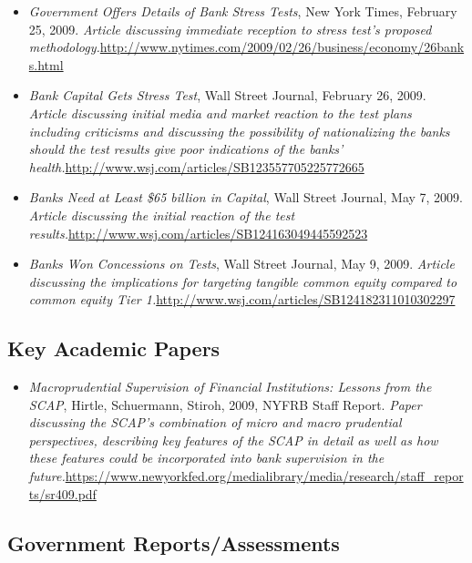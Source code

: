 \documentclass[12pt]{article}
\begin{document}
\begin{itemize}
\item
\emph{Government
  Offers Details of Bank Stress Tests}, New York Times, February 25,
  2009. \emph{Article discussing immediate reception to stress test's
  proposed methodology.}\url{http://www.nytimes.com/2009/02/26/business/economy/26banks.html}
\item
\emph{Bank
  Capital Gets Stress Test}, Wall Street Journal, February 26, 2009.
  \emph{Article discussing initial media and market reaction to the test
  plans including criticisms and discussing the possibility of
  nationalizing the banks should the test results give poor indications
  of the banks' health.}\url{http://www.wsj.com/articles/SB123557705225772665}
\item
\emph{Banks
  Need at Least \$65 billion in Capital}, Wall Street Journal, May 7,
  2009. \emph{Article discussing the initial reaction of the test
  results.}\url{http://www.wsj.com/articles/SB124163049445592523}
\item
\emph{Banks
  Won Concessions on Tests}, Wall Street Journal, May 9, 2009.
  \emph{Article discussing the implications for targeting tangible
  common equity compared to common equity Tier 1.}\url{http://www.wsj.com/articles/SB124182311010302297}
\end{itemize}

\subsection{Key Academic Papers}

\begin{itemize}
\item
\emph{Macroprudential
  Supervision of Financial Institutions: Lessons from the SCAP},
  Hirtle, Schuermann, Stiroh, 2009, NYFRB Staff Report. \emph{Paper
  discussing the SCAP's combination of micro and macro prudential
  perspectives, describing key features of the SCAP in detail as well as
  how these features could be incorporated into bank supervision in the
  future.}\url{https://www.newyorkfed.org/medialibrary/media/research/staff_reports/sr409.pdf}
\end{itemize}

\subsection{Government Reports/Assessments}
\end{document}
